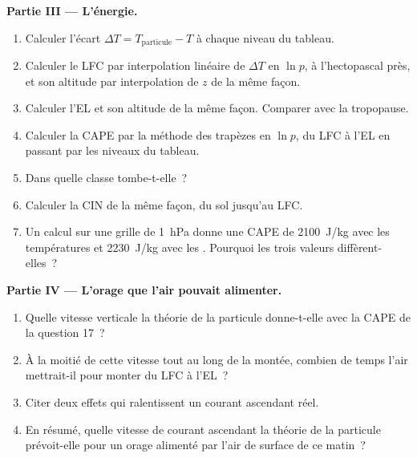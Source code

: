 \begin{problem}
\medskip\noindent\textbf{Partie III --- L'énergie.}
\begin{enumerate}[resume]
  \item Calculer l'écart $\Delta T = T_{\text{particule}} - T$ à chaque niveau du tableau.
  \item Calculer le LFC par interpolation linéaire de $\Delta T$ en $\ln p$, à l'hectopascal près,
        et son altitude par interpolation de $z$ de la même façon.
  \item Calculer l'EL et son altitude de la même façon. Comparer avec la tropopause.
  \item Calculer la CAPE par la méthode des trapèzes en $\ln p$, du LFC à l'EL en passant par les
        niveaux du tableau.
  \item Dans quelle classe tombe-t-elle~?
  \item Calculer la CIN de la même façon, du sol jusqu'au LFC.
  \item Un calcul sur une grille de \qty{1}{hPa} donne une CAPE de \qty{2100}{J/kg} avec les
        températures et \qty{2230}{J/kg} avec les . Pourquoi les trois valeurs
        diffèrent-elles~?
\end{enumerate}

\medskip\noindent\textbf{Partie IV --- L'orage que l'air pouvait alimenter.}
\begin{enumerate}[resume]
  \item Quelle vitesse verticale la théorie de la particule donne-t-elle avec la CAPE de la question 17~?
  \item À la moitié de cette vitesse tout au long de la montée, combien de temps l'air mettrait-il pour monter du LFC à l'EL~?
  \item Citer deux effets qui ralentissent un courant ascendant réel.
  \item En résumé, quelle vitesse de courant ascendant la théorie de la particule prévoit-elle
        pour un orage alimenté par l'air de surface de ce matin~?
\end{enumerate}
\end{problem}
